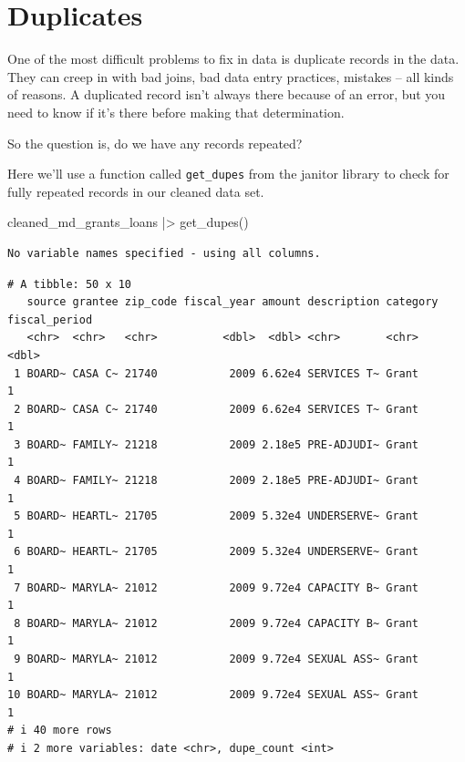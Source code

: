 \documentclass[
  letterpaper,
  DIV=11,
  numbers=noendperiod]{scrreprt}
\newenvironment{Shaded}{\begin{snugshade}}{\end{snugshade}}
\newcommand{\FunctionTok}[1]{\textcolor[rgb]{0.28,0.35,0.67}{#1}}
\newcommand{\NormalTok}[1]{\textcolor[rgb]{0.00,0.23,0.31}{#1}}
\newcommand{\SpecialCharTok}[1]{\textcolor[rgb]{0.37,0.37,0.37}{#1}}
\begin{document}
\hypertarget{duplicates}{%
\section{Duplicates}\label{duplicates}}

One of the most difficult problems to fix in data is duplicate records
in the data. They can creep in with bad joins, bad data entry practices,
mistakes -- all kinds of reasons. A duplicated record isn't always there
because of an error, but you need to know if it's there before making
that determination.

So the question is, do we have any records repeated?

Here we'll use a function called \texttt{get\_dupes} from the janitor
library to check for fully repeated records in our cleaned data set.

\begin{Shaded}
\begin{Highlighting}[]
\NormalTok{cleaned\_md\_grants\_loans }\SpecialCharTok{|\textgreater{}}
  \FunctionTok{get\_dupes}\NormalTok{()}
\end{Highlighting}
\end{Shaded}

\begin{verbatim}
No variable names specified - using all columns.
\end{verbatim}

\begin{verbatim}
# A tibble: 50 x 10
   source grantee zip_code fiscal_year amount description category fiscal_period
   <chr>  <chr>   <chr>          <dbl>  <dbl> <chr>       <chr>            <dbl>
 1 BOARD~ CASA C~ 21740           2009 6.62e4 SERVICES T~ Grant                1
 2 BOARD~ CASA C~ 21740           2009 6.62e4 SERVICES T~ Grant                1
 3 BOARD~ FAMILY~ 21218           2009 2.18e5 PRE-ADJUDI~ Grant                1
 4 BOARD~ FAMILY~ 21218           2009 2.18e5 PRE-ADJUDI~ Grant                1
 5 BOARD~ HEARTL~ 21705           2009 5.32e4 UNDERSERVE~ Grant                1
 6 BOARD~ HEARTL~ 21705           2009 5.32e4 UNDERSERVE~ Grant                1
 7 BOARD~ MARYLA~ 21012           2009 9.72e4 CAPACITY B~ Grant                1
 8 BOARD~ MARYLA~ 21012           2009 9.72e4 CAPACITY B~ Grant                1
 9 BOARD~ MARYLA~ 21012           2009 9.72e4 SEXUAL ASS~ Grant                1
10 BOARD~ MARYLA~ 21012           2009 9.72e4 SEXUAL ASS~ Grant                1
# i 40 more rows
# i 2 more variables: date <chr>, dupe_count <int>
\end{verbatim}
\end{document}
